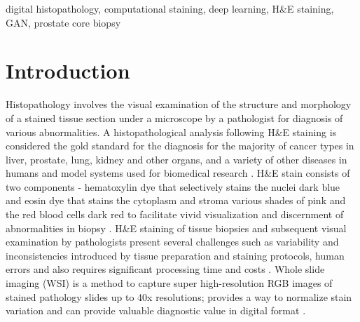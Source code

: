 \documentclass[10pt, conference, compsocconf]{IEEEtran}
\begin{document}
\begin{IEEEkeywords}
digital histopathology, computational staining, deep learning, H\&E staining, GAN, prostate core biopsy
\end{IEEEkeywords}


\IEEEpeerreviewmaketitle



\section{Introduction}
Histopathology involves the visual examination of the structure and morphology of a stained tissue section under a microscope by a pathologist for diagnosis of various abnormalities. A histopathological analysis following H\&E staining is considered the gold standard for the diagnosis for the majority of cancer types in liver, prostate, lung, kidney and other organs, and a variety of other diseases in humans and model systems used for biomedical research \cite{rubins_pathology}. H\&E stain consists of two components - hematoxylin dye that selectively stains the nuclei dark blue and eosin dye that stains the cytoplasm and stroma various shades of pink and the red blood cells dark red to facilitate vivid visualization and discernment of abnormalities in biopsy \cite{staining_protocol}. H\&E staining of tissue biopsies and subsequent visual examination by pathologists present several challenges such as variability and inconsistencies introduced by tissue preparation and staining protocols, human errors and also requires significant processing time and costs \cite{sources_of_variability}.  Whole slide imaging (WSI) is a method to capture super high-resolution RGB images of stained pathology slides up to 40x resolutions; provides a way to normalize stain variation and can provide valuable diagnostic value in digital format \cite{farahani2015whole,cho2017neural,zanjani2018stain,bug2017context,macenko2009method,mukhopadhyay2018whole}.
\end{document}
